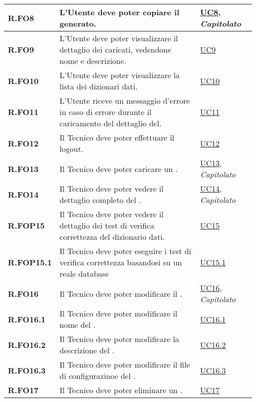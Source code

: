 \begin{longtable}{|P{3cm}|P{6,5cm}|>{\arraybackslash}P{4cm}|}
    \hline
    \textbf{R.FO8} & L’Utente  deve poter copiare il  generato. &  \hyperref[UC8]{UC8}, \emph{Capitolato}\\
    \hline
    \textbf{R.FO9} & L’Utente  deve poter visualizzare il dettaglio dei  caricati, vedendone nome e descrizione. &  \hyperref[UC9]{UC9}\\
    \hline
    \textbf{R.FO10} & L’Utente  deve poter visualizzare la lista dei dizionari dati. &  \hyperref[UC10]{UC10}\\
    \hline
    \textbf{R.FO11} & L’Utente  riceve un messaggio d'errore in caso di errore durante il caricamento del dettaglio del. &  \hyperref[UC11]{UC11}\\
    \hline
    \textbf{R.FO12} & Il Tecnico deve poter effettuare il logout. &  \hyperref[UC12]{UC12}\\
    \hline
    \textbf{R.FO13} & Il Tecnico deve poter caricare un . &  \hyperref[UC13]{UC13}, \emph{Capitolato}\\
    \hline
    \textbf{R.FO14} & Il Tecnico deve poter vedere il dettaglio completo del . &  \hyperref[UC14]{UC14}, \emph{Capitolato}\\
    \hline
    \textbf{R.FOP15} & Il Tecnico deve poter vedere il dettaglio dei test di verifica correttezza del dizionario dati. &  \hyperref[UC15]{UC15}\\
    \hline
    \textbf{R.FOP15.1} & Il Tecnico deve poter eseguire i test di verifica correttezza basandosi su un reale database &  \hyperref[UC15point1]{UC15.1}\\
    \hline
    \textbf{R.FO16} & Il Tecnico deve poter modificare il . &  \hyperref[UC16]{UC16}, \emph{Capitolato}\\
    \hline
    \textbf{R.FO16.1} & Il Tecnico deve poter modificare il nome del . &  \hyperref[UC16point1]{UC16.1}\\
    \hline
    \textbf{R.FO16.2} & Il Tecnico deve poter modificare la descrizione del . &  \hyperref[UC16point2]{UC16.2}\\
    \hline
    \textbf{R.FO16.3} & Il Tecnico deve poter modificare il file di configurazinoe del . &  \hyperref[UC16point3]{UC16.3}\\
    \hline
    \textbf{R.FO17} & Il Tecnico deve poter eliminare un . &  \hyperref[UC17]{UC17}\\

\end{longtable}
